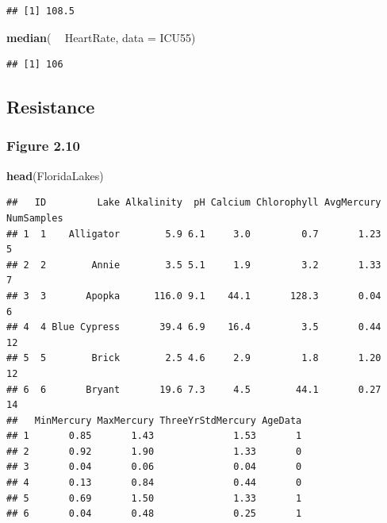 \documentclass[]{book}
\newenvironment{Shaded}{\begin{snugshade}}{\end{snugshade}}
\newcommand{\DataTypeTok}[1]{\textcolor[rgb]{0.13,0.29,0.53}{#1}}
\newcommand{\KeywordTok}[1]{\textcolor[rgb]{0.13,0.29,0.53}{\textbf{#1}}}
\newcommand{\NormalTok}[1]{#1}
\newcommand{\OperatorTok}[1]{\textcolor[rgb]{0.81,0.36,0.00}{\textbf{#1}}}
\newcommand{\StringTok}[1]{\textcolor[rgb]{0.31,0.60,0.02}{#1}}
\begin{document}
\begin{verbatim}
## [1] 108.5
\end{verbatim}

\begin{Shaded}
\begin{Highlighting}[]
\KeywordTok{median}\NormalTok{( }\OperatorTok{~}\StringTok{ }\NormalTok{HeartRate, }\DataTypeTok{data =}\NormalTok{ ICU55)}
\end{Highlighting}
\end{Shaded}

\begin{verbatim}
## [1] 106
\end{verbatim}

\hypertarget{resistance}{%
\subsection{Resistance}\label{resistance}}

\hypertarget{figure-2.10}{%
\subsubsection{Figure 2.10}\label{figure-2.10}}

\begin{Shaded}
\begin{Highlighting}[]
\KeywordTok{head}\NormalTok{(FloridaLakes)}
\end{Highlighting}
\end{Shaded}

\begin{verbatim}
##   ID         Lake Alkalinity  pH Calcium Chlorophyll AvgMercury NumSamples
## 1  1    Alligator        5.9 6.1     3.0         0.7       1.23          5
## 2  2        Annie        3.5 5.1     1.9         3.2       1.33          7
## 3  3       Apopka      116.0 9.1    44.1       128.3       0.04          6
## 4  4 Blue Cypress       39.4 6.9    16.4         3.5       0.44         12
## 5  5        Brick        2.5 4.6     2.9         1.8       1.20         12
## 6  6       Bryant       19.6 7.3     4.5        44.1       0.27         14
##   MinMercury MaxMercury ThreeYrStdMercury AgeData
## 1       0.85       1.43              1.53       1
## 2       0.92       1.90              1.33       0
## 3       0.04       0.06              0.04       0
## 4       0.13       0.84              0.44       0
## 5       0.69       1.50              1.33       1
## 6       0.04       0.48              0.25       1
\end{verbatim}
\end{document}
